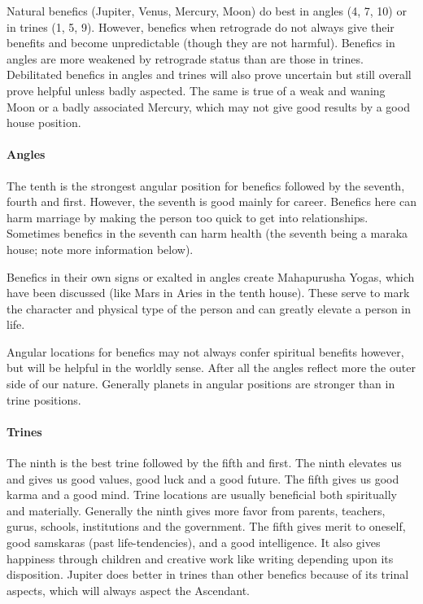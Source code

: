  

Natural benefics (Jupiter, Venus, Mercury, Moon) do best in angles (4, 7, 10) or in trines (1, 5, 9). However, benefics when retrograde do not always give their benefits and become unpredictable (though they are not harmful). Benefics in angles are more weakened by retrograde status than are those in trines. Debilitated benefics in angles and trines will also prove uncertain but still overall prove helpful unless badly aspected. The same is true of a weak and waning Moon or a badly associated Mercury, which may not give good results by a good house position.

 

\paragraph{Angles}

The tenth is the strongest angular position for benefics followed by the seventh, fourth and first. However, the seventh is good mainly for career. Benefics here can harm marriage by making the person too quick to get into relationships. Sometimes benefics in the seventh can harm health (the seventh being a maraka house; note more information below).

 

Benefics in their own signs or exalted in angles create Mahapurusha Yogas, which have been discussed (like Mars in Aries in the tenth house). These serve to mark the character and physical type of the person and can greatly elevate a person in life.

 

Angular locations for benefics may not always confer spiritual benefits however, but will be helpful in the worldly sense. After all the angles reflect more the outer side of our nature. Generally planets in angular positions are stronger than in trine positions.

 

\paragraph{Trines}

The ninth is the best trine followed by the fifth and first. The ninth elevates us and gives us good values, good luck and a good future. The fifth gives us good karma and a good mind. Trine locations are usually beneficial both spiritually and materially. Generally the ninth gives more favor from parents, teachers, gurus, schools, institutions and the government. The fifth gives merit to oneself, good samskaras (past life-tendencies), and a good intelligence. It also gives happiness through children and creative work like writing depending upon its disposition. Jupiter does better in trines than other benefics because of its trinal aspects, which will always aspect the Ascendant.


